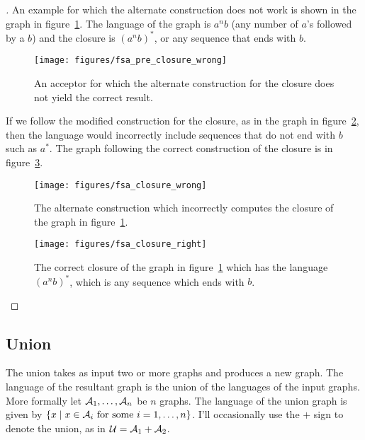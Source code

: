 \begin{proof}[\unskip\nopunct]
An example for which the alternate construction does not work is shown in the
graph in figure~\ref{fig:fsa_pre_closure_wrong}. The language of the graph
is $a^nb$ (any number of $a$'s followed by a $b$) and the closure is
$(a^nb)^*$, or any sequence that ends with $b$.

\begin{figure}
    \centering
    \texttt{[image: figures/fsa\_pre\_closure\_wrong]}
    \caption{An acceptor for which the alternate construction for the closure
    does not yield the correct result.}
    \label{fig:fsa_pre_closure_wrong}
\end{figure}

If we follow the modified construction for the closure, as in the graph in
figure~\ref{fig:fsa_closure_wrong}, then the language would incorrectly
include sequences that do not end with $b$ such as $a^*$. The graph
following the correct construction of the closure is in
figure~\ref{fig:fsa_closure_right}.

\begin{figure}
    \centering
    \texttt{[image: figures/fsa\_closure\_wrong]}
    \caption{The alternate construction which incorrectly computes the closure
    of the graph in figure~\ref{fig:fsa_pre_closure_wrong}.}
    \label{fig:fsa_closure_wrong}
\end{figure}


\begin{figure}
    \centering
    \texttt{[image: figures/fsa\_closure\_right]}
    \caption{The correct closure of the graph in
    figure~\ref{fig:fsa_pre_closure_wrong} which has the language $(a^nb)^*$, which
    is any sequence which ends with $b$.}
    \label{fig:fsa_closure_right}
\end{figure}

\end{proof}

\subsection{Union}

The union takes as input two or more graphs and produces a new graph. The
language of the resultant graph is the union of the languages of the input
graphs. More formally let $\mathcal{A}_1, \ldots, \mathcal{A}_n$ be $n$ graphs. The language of
the union graph is given by $\{ x \mid x \in \mathcal{A}_i \textrm{ for some } i = 1,
\ldots, n \}$. I'll occasionally use the $+$ sign to denote the union, as in
$\mathcal{U} = \mathcal{A}_1 + \mathcal{A}_2$.

